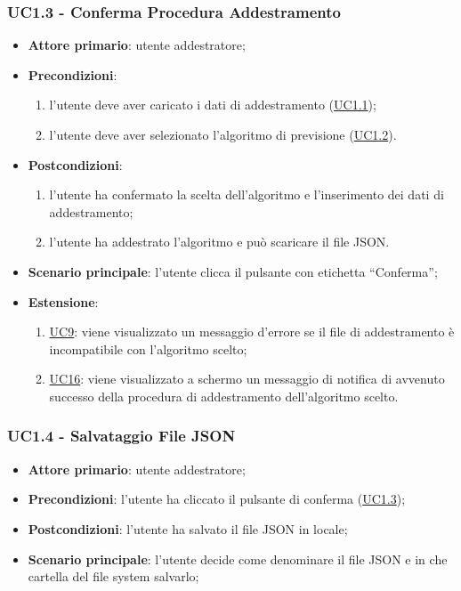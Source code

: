 	\subsubsection{UC1.3 - Conferma Procedura Addestramento}
		\begin{itemize}
			\item\textbf{Attore primario}: utente addestratore;
			\item\textbf{Precondizioni}:
				\begin{enumerate}
					\item l’utente deve aver caricato i dati di addestramento (\hyperref[par:UC1.1]{UC1.1});
					\item l’utente deve aver selezionato l’algoritmo di previsione (\hyperref[par:UC1.2]{UC1.2}).
				\end{enumerate}
			\item\textbf{Postcondizioni}:
				\begin{enumerate}
					\item l’utente ha confermato la scelta dell’algoritmo e l’inserimento dei dati di addestramento;
					\item l'utente ha addestrato l'algoritmo e può scaricare il file JSON.
				\end{enumerate}
			\item\textbf{Scenario principale}: l’utente clicca il pulsante con etichetta “Conferma”;
			\item\textbf{Estensione}:
					\begin{enumerate}
						\item\hyperref[par:UC9]{UC9}: viene visualizzato un messaggio d’errore se il file di addestramento è incompatibile con l’algoritmo scelto; 	
						\item\hyperref[par:UC16]{UC16}: viene visualizzato a schermo un messaggio di notifica di avvenuto successo della procedura di addestramento dell’algoritmo scelto.	
					\end{enumerate}
		\end{itemize}

	\label{par:UC1.4}
	\subsubsection{UC1.4 - Salvataggio File JSON}
		\begin{itemize}
			\item\textbf{Attore primario}: utente addestratore;
			\item\textbf{Precondizioni}: l’utente ha cliccato il pulsante di conferma (\hyperref[par:UC1.3]{UC1.3});
			\item\textbf{Postcondizioni}: l’utente ha salvato il file JSON in locale;
			\item\textbf{Scenario principale}: l’utente decide come denominare il file JSON e in che cartella del file system salvarlo; 		
		\end{itemize}

